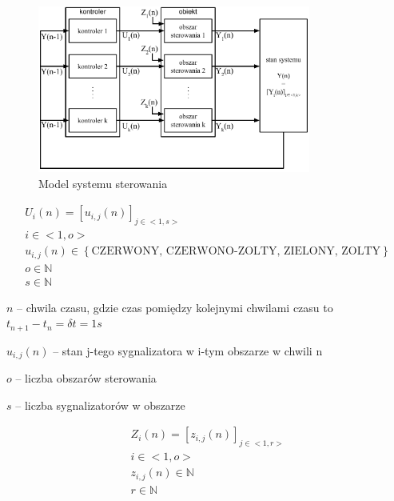 \begin{figure}[h]
    \centering
    \includegraphics[width=0.8\textwidth]{images/model.pdf}
    \caption{Model systemu sterowania}
    \label{fig:model}
\end{figure}

\begin{equation}
	\begin{array}{c}
		U_i (n) = \left[ u_{i, j} (n) \right]_{j \in <1,s>}\\
		i \in <1,o>\\
		u_{i, j} (n) \in \left\{ \textrm{CZERWONY, CZERWONO-ZOLTY, ZIELONY, ZOLTY} \right\}\\
		o \in \mathbb{N}\\
		s \in \mathbb{N}
	\end{array}
\end{equation}

\begin{math} n \end{math} \textrm{ -- chwila czasu, gdzie czas pomiędzy kolejnymi chwilami czasu to }
\begin{math} t_{n+1} - t_{n} = \delta t = 1s \end{math}

\begin{math} u_{i,j} (n) \end{math} \textrm{ -- stan j-tego sygnalizatora w i-tym obszarze w chwili n}

\begin{math} o \end{math} -- liczba obszarów sterowania

\begin{math} s \end{math} -- liczba sygnalizatorów w obszarze

\begin{equation}
	\begin{array}{c}
		Z_i (n) = \left[ z_{i, j} (n) \right]_{j \in <1,r>}\\
		i \in <1,o>\\
		z_{i, j} (n) \in \mathbb{N}\\
		r \in \mathbb{N}
	\end{array}
\end{equation}


